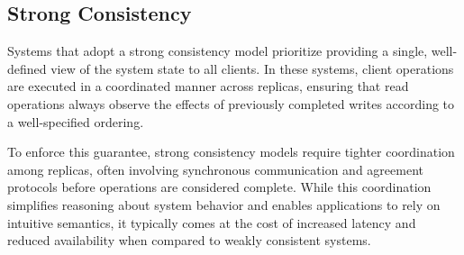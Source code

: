 \subsection{Strong Consistency}
\label{sub:strong}

Systems that adopt a strong consistency model prioritize providing a single, well-defined view of the system state to all clients. In these systems, client operations are executed in a coordinated manner across replicas, ensuring that read operations always observe the effects of previously completed writes according to a well-specified ordering.

To enforce this guarantee, strong consistency models require tighter coordination among replicas, often involving synchronous communication and agreement protocols before operations are considered complete. While this coordination simplifies reasoning about system behavior and enables applications to rely on intuitive semantics, it typically comes at the cost of increased latency and reduced availability when compared to weakly consistent systems.

